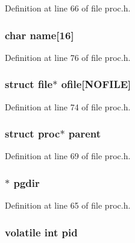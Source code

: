Definition at line 66 of file proc.\-h.

\hypertarget{structproc_acd328517a6cf718155c2e6e22b671ca9}{
\subsubsection[{name}]{\setlength{\rightskip}{0pt plus 5cm}char name\mbox{[}16\mbox{]}}}\label{structproc_acd328517a6cf718155c2e6e22b671ca9}


Definition at line 76 of file proc.\-h.

\hypertarget{structproc_a86c51eb2e4daa425944e034bfad64fb8}{
\subsubsection[{ofile}]{\setlength{\rightskip}{0pt plus 5cm}struct {\bf file}$\ast$ ofile\mbox{[}{\bf N\-O\-F\-I\-L\-E}\mbox{]}}}\label{structproc_a86c51eb2e4daa425944e034bfad64fb8}


Definition at line 74 of file proc.\-h.

\hypertarget{structproc_ad3a4594e539894e96ae2f8fea321fef2}{
\subsubsection[{parent}]{\setlength{\rightskip}{0pt plus 5cm}struct {\bf proc}$\ast$ parent}}\label{structproc_ad3a4594e539894e96ae2f8fea321fef2}


Definition at line 69 of file proc.\-h.

\hypertarget{structproc_abff3d102541220b0e98884d1fe2a6379}{
\subsubsection[{pgdir}]{$\ast$ pgdir}}\label{structproc_abff3d102541220b0e98884d1fe2a6379}


Definition at line 65 of file proc.\-h.

\hypertarget{structproc_a7b6cb9255530f2807765ad74872ebdc5}{
\subsubsection[{pid}]{\setlength{\rightskip}{0pt plus 5cm}volatile int pid}}\label{structproc_a7b6cb9255530f2807765ad74872ebdc5}


